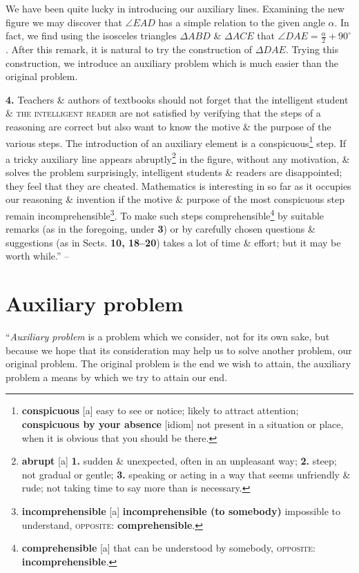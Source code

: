 \documentclass[oneside]{book}
\numberwithin{equation}{section}
\begin{document}
We have been quite lucky in introducing our auxiliary lines. Examining the new figure we may discover that $\angle EAD$ has a simple relation to the given angle $\alpha$. In fact, we find using the isosceles triangles $\Delta ABD$ \& $\Delta ACE$ that $\angle DAE = \frac{\alpha}{2} + 90^\circ$. After this remark, it is natural to try the construction of $\Delta DAE$. Trying this construction, we introduce an auxiliary problem which is much easier than the original problem.

\textbf{4.} Teachers \& authors of textbooks should not forget that the intelligent student \& \textsc{the intelligent reader} are not satisfied by verifying that the steps of a reasoning are correct but also want to know the motive \& the purpose of the various steps. The introduction of an auxiliary element is a conspicuous\footnote{\textbf{conspicuous} [a] easy to see or notice; likely to attract attention; \textbf{conspicuous by your absence} [idiom] not present in a situation or place, when it is obvious that you should be there.} step. If a tricky auxiliary line appears abruptly\footnote{\textbf{abrupt} [a] \textbf{1.} sudden \& unexpected, often in an unpleasant way; \textbf{2.} steep; not gradual or gentle; \textbf{3.} speaking or acting in a way that seems unfriendly \& rude; not taking time to say more than is necessary.} in the figure, without any motivation, \& solves the problem surprisingly, intelligent students \& readers are disappointed; they feel that they are cheated. Mathematics is interesting in so far as it occupies our reasoning \& invention if the motive \& purpose of the most conspicuous step remain incomprehensible\footnote{\textbf{incomprehensible} [a] \textbf{incomprehensible (to somebody)} impossible to understand, \textsc{opposite}: \textbf{comprehensible}.}. To make such steps comprehensible\footnote{\textbf{comprehensible} [a] that can be understood by somebody, \textsc{opposite}: \textbf{incomprehensible}.} by suitable remarks (as in the foregoing, under \textbf{3}) or by carefully chosen questions \& suggestions (as in Sects. \textbf{10, 18--20}) takes a lot of time \& effort; but it may be worth while.'' -- \cite[pp. 46--50]{Polya2014}

\section{Auxiliary problem}
``\textit{Auxiliary problem} is a problem which we consider, not for its own sake, but because we hope that its consideration may help us to solve another problem, our original problem. The original problem is the end we wish to attain, the auxiliary problem a means by which we try to attain our end.
\end{document}

